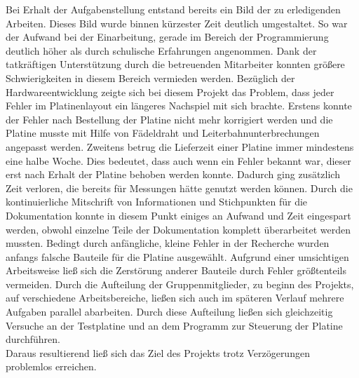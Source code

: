 Bei Erhalt der Aufgabenstellung entstand bereits ein Bild der zu erledigenden Arbeiten. Dieses Bild wurde binnen kürzester Zeit deutlich umgestaltet. So war der Aufwand bei der Einarbeitung, gerade im Bereich der Programmierung deutlich höher als durch schulische Erfahrungen angenommen. Dank der tatkräftigen Unterstützung durch die betreuenden Mitarbeiter konnten größere Schwierigkeiten in diesem Bereich vermieden werden. Bezüglich der Hardwareentwicklung zeigte sich bei diesem Projekt das Problem, dass jeder Fehler im Platinenlayout ein längeres Nachspiel mit sich brachte. Erstens konnte der Fehler nach Bestellung der Platine nicht mehr korrigiert werden und die Platine musste mit Hilfe von Fädeldraht und Leiterbahnunterbrechungen angepasst werden. Zweitens betrug die Lieferzeit einer Platine immer mindestens eine halbe Woche. Dies bedeutet, dass auch wenn ein Fehler bekannt war, dieser erst nach Erhalt der Platine behoben werden konnte. Dadurch ging zusätzlich Zeit verloren, die bereits für Messungen hätte genutzt werden können. Durch die kontinuierliche Mitschrift von Informationen und Stichpunkten für die Dokumentation konnte in diesem Punkt einiges an Aufwand und Zeit eingespart werden, obwohl einzelne Teile der Dokumentation komplett überarbeitet werden mussten. Bedingt durch anfängliche, kleine Fehler in der Recherche wurden anfangs falsche Bauteile für die Platine ausgewählt. Aufgrund einer umsichtigen Arbeitsweise ließ sich die Zerstörung anderer Bauteile durch Fehler größtenteils vermeiden. Durch die Aufteilung der Gruppenmitglieder, zu beginn des Projekts, auf verschiedene Arbeitsbereiche, ließen sich auch im späteren Verlauf mehrere Aufgaben parallel abarbeiten. Durch diese Aufteilung ließen sich gleichzeitig Versuche an der Testplatine und an dem Programm zur Steuerung der Platine durchführen.\\
Daraus resultierend ließ sich das Ziel des Projekts trotz Verzögerungen problemlos erreichen.
